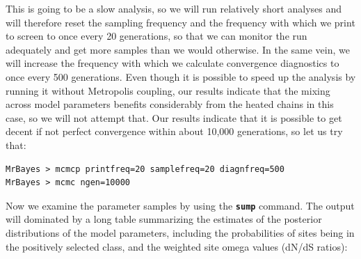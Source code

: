 \documentclass[12pt]{book}
\newcommand{\ttt}[1]{\texttt{#1}}
\newcommand{\tb}[1]{\ttt{\textbf{#1}}}
\begin{document}
This is going to be a slow analysis, so we will run relatively short analyses and will therefore
reset the sampling frequency and the frequency with which we print to screen to once every 20
generations, so that we can monitor the run adequately and get more samples than we would
otherwise. In the same vein, we will increase the frequency with which we calculate convergence
diagnostics to once every 500 generations. Even though it is possible to speed up the analysis by
running it without Metropolis coupling, our results indicate that the mixing across model
parameters benefits considerably from the heated chains in this case, so we will not attempt that.
Our results indicate that it is possible to get decent if not perfect convergence within about
10,000 generations, so let us try that:

\begin{Verbatim}
MrBayes > mcmcp printfreq=20 samplefreq=20 diagnfreq=500
MrBayes > mcmc ngen=10000
\end{Verbatim}

Now we examine the parameter samples by using the \tb{sump} command. The output will dominated by a
long table summarizing the estimates of the posterior distributions of the model parameters,
including the probabilities of sites being in the positively selected class, and the weighted site
omega values (dN/dS ratios):
\end{document}
